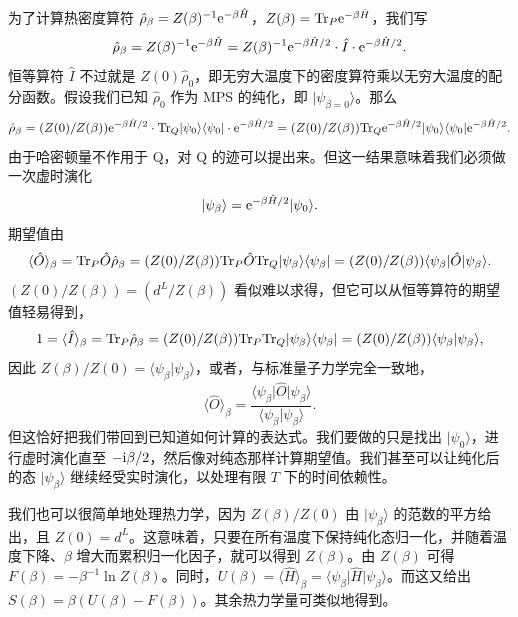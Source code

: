 \documentclass[a4paper,10pt,oneside,onecolumn,1p,times]{elsarticle}
\newcommand{\tr}{{\rm Tr }}
\newcommand{\eul}{{\rm e }}
\newcommand{\imag}{{\rm i }}
\newcommand{\bra}[1]{\mbox{$\langle #1  |$}}
\newcommand{\ket}[1]{\mbox{$| #1  \rangle$}}
\newcommand{\braket}[2]{\mbox{$\langle #1  | #2 \rangle$}} 	%
\begin{document}
为了计算热密度算符 $\hat{\rho}_\beta= Z(\beta)^{-1} \eul^{-\beta \hat{H}}$，$Z(\beta) = \tr_P \eul^{-\beta \hat{H}}$，我们写
\begin{equation}
\hat{\rho}_\beta = Z(\beta)^{-1} \eul^{-\beta \hat{H}} = Z(\beta)^{-1} \eul^{-\beta \hat{H}/2} \cdot \hat{I} \cdot \eul^{-\beta \hat{H}/2} .
\end{equation}
恒等算符 $\hat{I}$ 不过就是 $Z(0) \hat{\rho}_0$，即无穷大温度下的密度算符乘以无穷大温度的配分函数。假设我们已知 $\hat{\rho}_0$ 作为 MPS 的纯化，即 $\ket{\psi_{\beta=0}}$。那么
\begin{equation}
\hat{\rho}_\beta = (Z(0)/Z(\beta)) \eul^{-\beta \hat{H}/2} \cdot \tr_Q \ket{\psi_0}\bra{\psi_0} \cdot \eul^{-\beta \hat{H}/2} = (Z(0)/Z(\beta)) \tr_Q \eul^{-\beta \hat{H}/2}\ket{\psi_0} \bra{\psi_0}\eul^{-\beta \hat{H}/2} .
\end{equation}
由于哈密顿量不作用于 Q，对 Q 的迹可以提出来。但这一结果意味着我们必须做一次虚时演化
\begin{equation}
\ket{\psi_\beta} = \eul^{-\beta \hat{H}/2}\ket{\psi_0} .
\end{equation}
期望值由
\begin{equation}
\langle \hat{O} \rangle_\beta = \tr_P \hat{O}\hat{\rho}_\beta =
(Z(0)/Z(\beta)) \tr_P \hat{O} \tr_Q \ket{\psi_\beta} \bra{\psi_\beta}
= (Z(0)/Z(\beta)) \bra{\psi_\beta} \hat{O} \ket{\psi_\beta} .
\end{equation} 
$(Z(0)/Z(\beta)) = (d^L/Z(\beta))$ 看似难以求得，但它可以从恒等算符的期望值轻易得到，
\begin{equation}
1 = \langle \hat{I} \rangle_\beta = \tr_P \hat{\rho}_\beta =
(Z(0)/Z(\beta)) \tr_P \tr_Q \ket{\psi_\beta} \bra{\psi_\beta}
= (Z(0)/Z(\beta)) \braket{\psi_\beta}{\psi_\beta} ,
\end{equation} 
因此 $Z(\beta)/Z(0)= \braket{\psi_\beta}{\psi_\beta}$，或者，与标准量子力学完全一致地，
\begin{equation}
\langle \hat{O} \rangle_\beta = \frac{ \bra{\psi_\beta} \hat{O}\ket{\psi_\beta}}{\braket{\psi_\beta}{\psi_\beta}} .
\end{equation}
但这恰好把我们带回到已知道如何计算的表达式。我们要做的只是找出 $\ket{\psi_0}$，进行虚时演化直至 $-\imag\beta/2$，然后像对纯态那样计算期望值。我们甚至可以让纯化后的态 $\ket{\psi_\beta}$ 继续经受实时演化，以处理有限 $T$ 下的时间依赖性。

我们也可以很简单地处理热力学，因为 $Z(\beta)/Z(0)$ 由 $\ket{\psi_\beta}$ 的范数的平方给出，且 $Z(0)=d^L$。这意味着，只要在所有温度下保持纯化态归一化，并随着温度下降、$\beta$ 增大而累积归一化因子，就可以得到 $Z(\beta)$。由 $Z(\beta)$ 可得 $F(\beta)=-\beta^{-1} \ln Z(\beta)$。同时，$U(\beta) = \langle \hat{H} \rangle_\beta = \bra{\psi_\beta} \hat{H} \ket{\psi_\beta}$。而这又给出 $S(\beta) = \beta(U(\beta)-F(\beta))$。其余热力学量可类似地得到。
\end{document}
